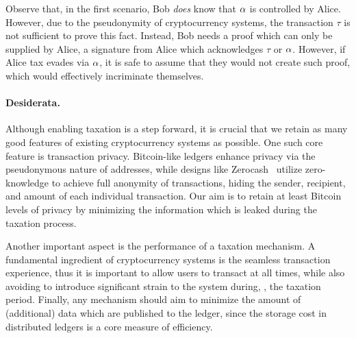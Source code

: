 Observe that, in the first scenario, Bob \emph{does} know that $\alpha$ is
controlled by Alice. However, due to the pseudonymity of cryptocurrency
systems, the transaction $\tau$ is not sufficient to prove this fact. Instead,
Bob needs a proof which can only be supplied by Alice, \eg a signature from
Alice which acknowledges $\tau$ or $\alpha$. However, if Alice tax evades via
$\alpha$, it is safe to assume that they would not create such proof, which
would effectively incriminate themselves.

\paragraph{Desiderata.}\label{subsec:desiderata}

Although enabling taxation is a step forward, it is crucial that we retain as
many good features of existing cryptocurrency systems as possible. One such
core feature is transaction privacy. Bitcoin-like ledgers enhance privacy via
the pseudonymous nature of addresses, while designs like
Zerocash~\cite{SP:BCGGMT14} utilize zero-knowledge to achieve full anonymity of
transactions, \ie hiding the sender, recipient, and amount of each individual
transaction. Our aim is to retain at least Bitcoin levels of privacy by
minimizing the information which is leaked during the taxation process.

Another important aspect is the performance of a taxation mechanism.  A
fundamental ingredient of cryptocurrency systems is the seamless transaction
experience, thus it is important to allow users to transact at all times, while
also avoiding to introduce significant strain to the system during, \eg, the
taxation period. Finally, any mechanism should aim to minimize the amount of
(additional) data which are published to the ledger, since the storage cost in
distributed ledgers is a core measure of efficiency.

